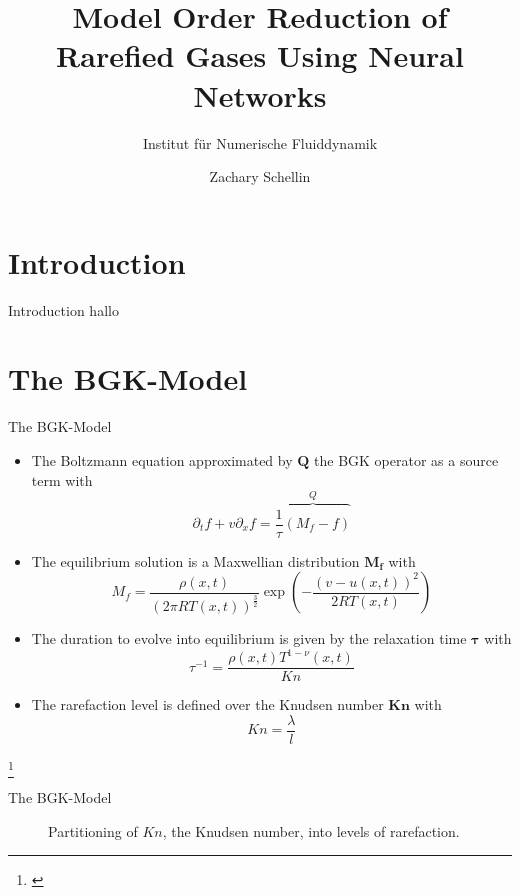 \documentclass[Nike]{tuberlinbeamer}
\title{Model Order Reduction of Rarefied Gases Using Neural Networks}
\subtitle{Institut f\"ur Numerische Fluiddynamik}
\author[Zachary Schellin]{Zachary Schellin}
\institute{Technische Universität Berlin}
\begin{document}
\begin{frame}
\maketitle
\end{frame}


\begin{frame}
\tableofcontents
\end{frame}
\section{Introduction}
\begin{frame}[fragile]{Introduction}
 hallo
\end{frame}
\section{The BGK-Model}
\begin{frame}[fragile]{The BGK-Model}
	\begin{itemize}
		\item The Boltzmann equation approximated by $\boldsymbol{Q}$ the BGK operator as a source term with
		\begin{equation}
		\partial_t f + v \partial_x f = \overbrace{\frac{1}{\tau} (M_f - f)}^{Q}
		\end{equation}

		\item The equilibrium solution is a Maxwellian distribution $\boldsymbol{M_f}$ with
		\begin{equation}
		M_f = \frac{\rho(x,t)}{(2\pi R T(x,t))^{\frac{3}{2}}}\exp(-\frac{(v - u(x,t))^2}{2 R T(x,t)}) 
		\end{equation}

		\item The duration to evolve into equilibrium is given by the relaxation time $\boldsymbol{\tau}$ with
		\begin{equation}
		\tau^{-1} = \frac{\rho(x,t)T^{1-\nu}(x,t)}{Kn}
		\end{equation}

		\item The rarefaction level is defined over the Knudsen number $\boldsymbol{Kn}$ with
		\begin{equation}
		Kn = \frac{\lambda}{l}
		\end{equation}
	\end{itemize}\footnote{\cite{BGK}}
\end{frame}
\begin{frame}[fragile]{The BGK-Model}
		\begin{figure}[H]
		
		\caption{Partitioning of $Kn$, the Knudsen number, into levels of rarefaction.}
		\label{Fig:ExpKN}
	\end{figure}
\end{frame}
\end{document}
